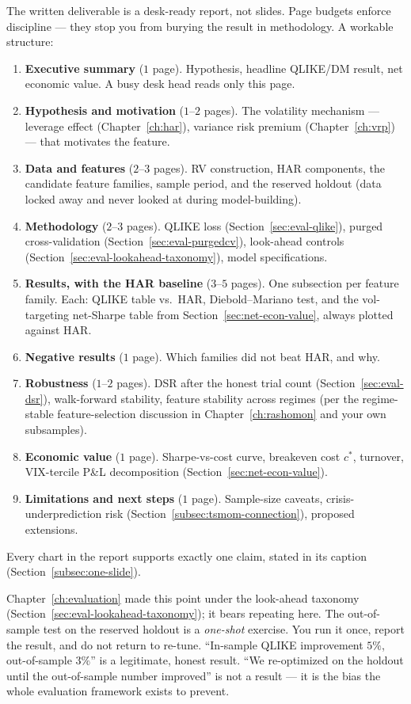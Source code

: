 The written deliverable is a desk-ready report, not slides. Page budgets enforce discipline --- they stop you from burying the result in methodology. A workable structure:
\begin{enumerate}[leftmargin=1.5em, nosep]
  \item \textbf{Executive summary} ($1$ page). Hypothesis, headline QLIKE/DM result, net economic value. A busy desk head reads only this page.
  \item \textbf{Hypothesis and motivation} ($1$--$2$ pages). The volatility mechanism --- leverage effect (Chapter~\ref{ch:har}), variance risk premium (Chapter~\ref{ch:vrp}) --- that motivates the feature.
  \item \textbf{Data and features} ($2$--$3$ pages). RV construction, HAR components, the candidate feature families, sample period, and the reserved holdout (data locked away and never looked at during model-building).
  \item \textbf{Methodology} ($2$--$3$ pages). QLIKE loss (Section~\ref{sec:eval-qlike}), purged cross-validation (Section~\ref{sec:eval-purgedcv}), look-ahead controls (Section~\ref{sec:eval-lookahead-taxonomy}), model specifications.
  \item \textbf{Results, with the HAR baseline} ($3$--$5$ pages). One subsection per feature family. Each: QLIKE table vs.\ HAR, Diebold--Mariano test, and the vol-targeting net-Sharpe table from Section~\ref{sec:net-econ-value}, always plotted against HAR.
  \item \textbf{Negative results} ($1$ page). Which families did not beat HAR, and why.
  \item \textbf{Robustness} ($1$--$2$ pages). DSR after the honest trial count (Section~\ref{sec:eval-dsr}), walk-forward stability, feature stability across regimes (per the regime-stable feature-selection discussion in Chapter~\ref{ch:rashomon} and your own subsamples).
  \item \textbf{Economic value} ($1$ page). Sharpe-vs-cost curve, breakeven cost $c^\ast$, turnover, VIX-tercile P\&L decomposition (Section~\ref{sec:net-econ-value}).
  \item \textbf{Limitations and next steps} ($1$ page). Sample-size caveats, crisis-underprediction risk (Section~\ref{subsec:tsmom-connection}), proposed extensions.
\end{enumerate}
Every chart in the report supports exactly one claim, stated in its caption (Section~\ref{subsec:one-slide}).

\begin{warning}
Chapter~\ref{ch:evaluation} made this point under the look-ahead taxonomy (Section~\ref{sec:eval-lookahead-taxonomy}); it bears repeating here. The out-of-sample test on the reserved holdout is a \emph{one-shot} exercise. You run it once, report the result, and do not return to re-tune. ``In-sample QLIKE improvement $5\%$, out-of-sample $3\%$'' is a legitimate, honest result. ``We re-optimized on the holdout until the out-of-sample number improved'' is not a result --- it is the bias the whole evaluation framework exists to prevent.
\end{warning}

